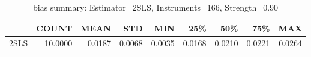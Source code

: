 \begin{table}[ht]
\centering
\caption{bias summary: Estimator=2SLS, Instruments=166, Strength=0.90}
\begin{tabular}{lrrrrrrrr}
\toprule
 & COUNT & MEAN & STD & MIN & 25\% & 50\% & 75\% & MAX \\
\midrule
2SLS & 10.0000 & 0.0187 & 0.0068 & 0.0035 & 0.0168 & 0.0210 & 0.0221 & 0.0264 \\
\bottomrule
\end{tabular}
\end{table}
